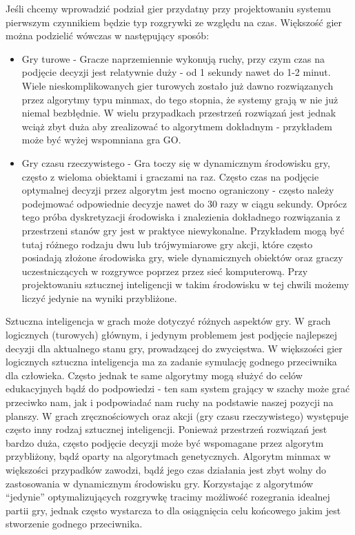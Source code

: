 \begin{par}
Jeśli chcemy wprowadzić podział gier przydatny przy projektowaniu systemu pierwszym czynnikiem będzie typ rozgrywki ze względu na czas.
Większość gier można podzielić wówczas w następujący sposób:
\begin{itemize}
	\item Gry turowe - Gracze naprzemiennie wykonują ruchy, przy czym czas na podjęcie decyzji jest relatywnie duży - od 1 sekundy nawet do 1-2 minut.
Wiele nieskomplikowanych gier turowych zostało już dawno rozwiązanych przez algorytmy typu minmax, do tego stopnia, że systemy grają w nie już niemal bezbłędnie. 
W wielu przypadkach przestrzeń rozwiązań jest jednak wciąż zbyt duża aby zrealizować to algorytmem dokładnym - przykładem może być wyżej wspomniana gra GO.
	\item Gry czasu rzeczywistego - Gra toczy się w dynamicznym środowisku gry, często z wieloma obiektami i graczami na raz. Często czas na podjęcie optymalnej decyzji przez algorytm jest mocno ograniczony - często należy podejmować odpowiednie decyzje nawet do 30 razy w ciągu sekundy. Oprócz tego próba dyskretyzacji środowiska i znalezienia dokładnego rozwiązania z przestrzeni stanów gry jest w praktyce niewykonalne. Przykładem mogą być tutaj różnego rodzaju dwu lub trójwymiarowe gry akcji, które często posiadają złożone środowiska gry, wiele dynamicznych obiektów oraz graczy uczestniczących w rozgrywce poprzez przez sieć komputerową. Przy projektowaniu sztucznej inteligencji w takim środowisku w tej chwili możemy liczyć jedynie na wyniki przybliżone.
\end{itemize}
Sztuczna inteligencja w grach może dotyczyć różnych aspektów gry. 
W grach logicznych (turowych) głównym, i jedynym problemem jest podjęcie najlepszej decyzji dla aktualnego stanu gry, prowadzącej do zwycięstwa. 
W większości gier logicznych sztuczna inteligencja ma za zadanie symulację godnego przeciwnika dla człowieka.
Często jednak te same algorytmy mogą służyć do celów edukacyjnych bądź do podpowiedzi - ten sam system grający w szachy może grać przeciwko nam, jak i podpowiadać nam ruchy na podstawie naszej pozycji na planszy.
W grach zręcznościowych oraz akcji (gry czasu rzeczywistego) występuje często inny rodzaj sztucznej inteligencji.
Ponieważ przestrzeń rozwiązań jest bardzo duża, często podjęcie decyzji może być wspomagane przez algorytm przybliżony, bądź oparty na algorytmach genetycznych.
Algorytm minmax w większości przypadków zawodzi, bądź jego czas działania jest zbyt wolny do zastosowania w dynamicznym środowisku gry.
Korzystając z algorytmów ``jedynie'' optymalizujących rozgrywkę tracimy możliwość rozegrania idealnej partii gry, jednak często wystarcza to dla osiągnięcia celu końcowego jakim jest
stworzenie godnego przeciwnika.
\end{par}

